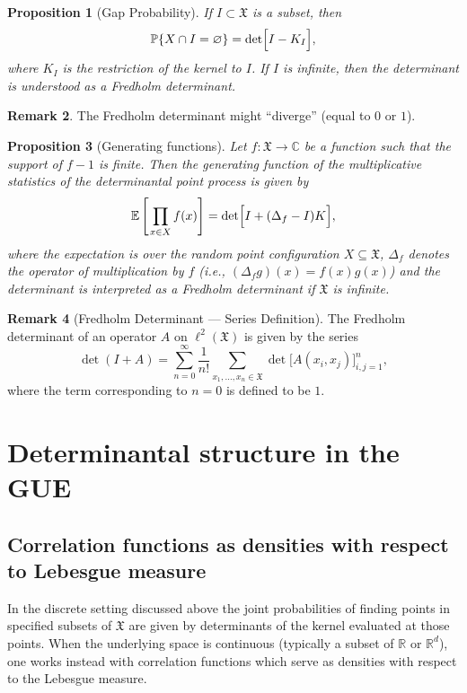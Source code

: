 \documentclass[letterpaper,11pt,oneside,reqno]{book}
\numberwithin{equation}{chapter}  %
\newcommand{\ssp}{\hspace{1pt}}
\newtheorem{proposition}{Proposition}[chapter]  %
\theoremstyle{definition}
\newtheorem{remark}[proposition]{Remark}
\begin{document}
\begin{proposition}[Gap Probability]
	If $I\subset\mathfrak{X}$ is a subset, then
	\[
	\operatorname{\mathbb{P}}\{X\cap I=\varnothing\}=\det\Bigl[I-K_I\Bigr],
	\]
	where $K_I$ is the restriction of the kernel to $I$.
	If $I$ is infinite, then the determinant is understood as a
	Fredholm determinant.
\end{proposition}
\begin{remark}
	The Fredholm determinant
	might ``diverge'' (equal to $0$ or $1$).
\end{remark}

\begin{proposition}[Generating functions]
	\label{lecture5:prop:gen-func}
	Let $f:\mathfrak{X}\to\mathbb{C}$ be a function such that the support of $f-1$ is finite. Then the generating function of the multiplicative statistics of the determinantal point process is given by
	\[
	\mathbb{E}\left[\ssp\prod_{x\in X} f(x)\right]
	=\det\Bigl[I + (\Delta_f - I)K\Bigr],
	\]
	where the expectation is over the random point configuration $X\subseteq\mathfrak{X}$,
	$\Delta_f$ denotes the operator of multiplication by $f$ (i.e., $(\Delta_f g)(x)=f(x)g(x)$)
	and the determinant is interpreted as a Fredholm determinant if $\mathfrak{X}$ is infinite.
\end{proposition}

\begin{remark}[Fredholm Determinant --- Series Definition]
	The Fredholm determinant of an operator $A$ on $\ell^2(\mathfrak{X})$ is given by the series
	\[
	\det(I+A)=\sum_{n=0}^\infty \frac{1}{n!}\sum_{x_1,\dots,x_n\in\mathfrak{X}} \det\bigl[A(x_i,x_j)\bigr]_{i,j=1}^n,
	\]
	where the term corresponding to $n=0$ is defined to be $1$.
\end{remark}


\section{Determinantal structure in the GUE}
\label{lecture5:sec:gue-dpp}

\subsection{Correlation functions as densities with respect to Lebesgue measure}
\label{lecture5:sec:corr-functions-lebesgue}

In the discrete setting discussed above the joint probabilities of finding points in specified subsets of $\mathfrak{X}$ are given by determinants of the kernel evaluated at those points. When the underlying space is continuous (typically a subset of $\mathbb{R}$ or $\mathbb{R}^d$), one works instead with correlation functions which serve as densities with respect to the Lebesgue measure.
\end{document}

